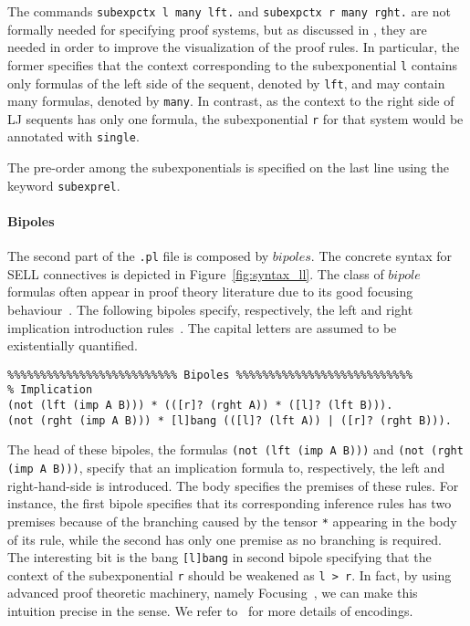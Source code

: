 \documentclass{llncs}
\begin{document}
The commands \texttt{subexpctx l many lft.} and  \texttt{subexpctx r many rght.} are not formally needed for specifying proof systems, 
but as discussed 
in \cite{nigam14ebl}, they are needed in order to improve the visualization of the proof rules. 
In particular, the former specifies that the context corresponding to the subexponential \texttt{l} contains 
only formulas of the left side of the sequent, denoted by \texttt{lft}, and may contain many formulas, denoted 
by \texttt{many}. In contrast, as the context to the right side of LJ sequents has only one formula, the 
subexponential \texttt{r} for that system would be annotated with \texttt{single}.

The pre-order among the subexponentials is specified on the last line using the
keyword \texttt{subexprel}.

\paragraph{Bipoles}
%
The second part of the \texttt{.pl} file is composed by $bipoles$. The concrete syntax for SELL connectives
is depicted in Figure~\ref{fig:syntax_ll}. The class of $bipole$ formulas often
appear in proof theory literature due to its good focusing
behaviour~\cite{andreoli92jlc}. The following bipoles specify, 
respectively, the left and right implication introduction rules~\cite{nigam.jlc}. The capital 
letters are assumed to be existentially quantified.
\vspace{-1mm}

{\small
\begin{verbatim}
%%%%%%%%%%%%%%%%%%%%%%%%%% Bipoles %%%%%%%%%%%%%%%%%%%%%%%%%%%
% Implication
(not (lft (imp A B))) * (([r]? (rght A)) * ([l]? (lft B))).
(not (rght (imp A B))) * [l]bang (([l]? (lft A)) | ([r]? (rght B))).
\end{verbatim}
}

The head of these bipoles, the formulas \texttt{(not (lft (imp A B)))} and
\texttt{(not (rght (imp A B)))}, specify that an implication formula to, respectively, 
the left and right-hand-side is introduced. The body specifies the premises of these
rules. For instance, the first bipole specifies that its corresponding inference rules
has two premises because of the branching caused by the  
tensor \texttt{*} appearing in the body of its rule, while
the second has only one premise as no branching is required. 
The interesting bit is the bang \texttt{[l]bang} in second bipole specifying that the 
context of the subexponential \texttt{r} should be weakened as \texttt{l > r}.
In fact, by using advanced proof theoretic machinery, namely Focusing~\cite{andreoli92jlc}, 
we can make this intuition precise in the sense. We refer to~\cite{nigam.jlc} for more details
of encodings.
\end{document}
